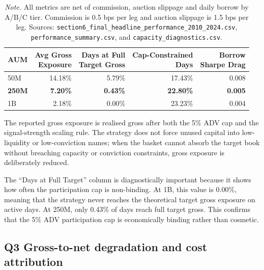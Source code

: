\documentclass[12pt,a4paper]{article}
\begin{document}
\begin{table}[H]
\vspace{0.25em}
\setlength{\tabcolsep}{10pt}
\begin{tabular}{lrrrr}
\toprule
\textbf{AUM} &
\shortstack{\textbf{Avg Gross}\\\textbf{Exposure}} &
\shortstack{\textbf{Days at Full}\\\textbf{Target Gross}} &
\shortstack{\textbf{Cap-Constrained}\\\textbf{Days}} &
\shortstack{\textbf{Borrow}\\\textbf{Sharpe Drag}} \\
\midrule
50M
& 14.18\% & 5.79\% & 17.43\% & 0.008 \\
\textbf{250M}
& \textbf{7.20\%} & \textbf{0.43\%} & \textbf{22.80\%} & \textbf{0.005} \\
1B
& 2.18\% & 0.00\% & 23.23\% & 0.004 \\
\bottomrule
\end{tabular}

\vspace{0.5em}
\caption*{\footnotesize
\textit{Note.} All metrics are net of commission, auction slippage and daily borrow by A/B/C tier.
Commission is 0.5 bps per leg and auction slippage is 1.5 bps per leg.
Sources: \texttt{section6\_final\_headline\_performance\_2010\_2024.csv},
\texttt{performance\_summary.csv}, and \texttt{capacity\_diagnostics.csv}.}
\end{table}

The reported gross exposure is realised gross after both the 5\% ADV cap and
the signal-strength scaling rule. The strategy does not force unused capital
into low-liquidity or low-conviction names; when the basket cannot absorb the
target book without breaching capacity or conviction constraints, gross exposure
is deliberately reduced.

The ``Days at Full Target'' column is diagnostically important because it shows
how often the participation cap is non-binding. At 1B, this value is 0.00\%,
meaning that the strategy never reaches the theoretical target gross exposure on
active days. At 250M, only 0.43\% of days reach full target gross. This confirms
that the 5\% ADV participation cap is economically binding rather than cosmetic.

\subsection*{Q3 \quad Gross-to-net degradation and cost attribution}
\end{document}
